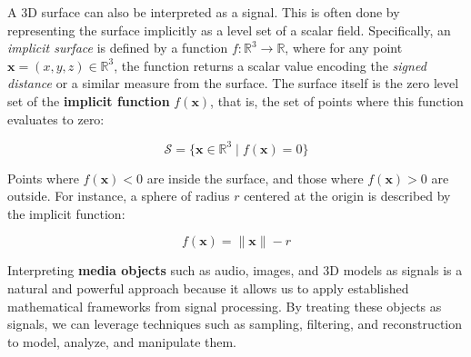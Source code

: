 A 3D surface can also be interpreted as a signal. This is often done by representing the surface implicitly as a level set of a scalar field. Specifically, an \textit{implicit surface} is defined by a function \( f : \mathbb{R}^3 \rightarrow \mathbb{R} \), where for any point \( \mathbf{x} = (x, y, z) \in \mathbb{R}^3 \), the function returns a scalar value encoding the \textit{signed distance} or a similar measure from the surface. The surface itself is the zero level set of the \textbf{implicit function} \( f(\mathbf{x}) \), that is, the set of points where this function evaluates to zero:

\[
\mathcal{S} = \{ \mathbf{x} \in \mathbb{R}^3 \mid f(\mathbf{x}) = 0 \}
\]

Points where \( f(\mathbf{x}) < 0 \) are inside the surface, and those where \( f(\mathbf{x}) > 0 \) are outside. For instance, a sphere of radius \( r \) centered at the origin is described by the implicit function:

\[
f(\mathbf{x}) = \|\mathbf{x}\| - r
\]

Interpreting \textbf{media objects} such as audio, images, and 3D models as signals is a natural and powerful approach because it allows us to apply established mathematical frameworks from signal processing. By treating these objects as signals, we can leverage techniques such as sampling, filtering, and reconstruction to model, analyze, and manipulate them.






